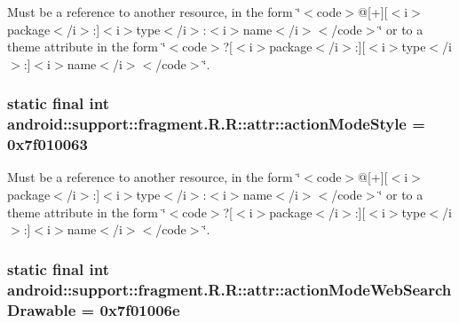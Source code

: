 Must be a reference to another resource, in the form \char`\"{}$<$code$>$@\mbox{[}+\mbox{]}\mbox{[}$<$i$>$package$<$/i$>$:\mbox{]}$<$i$>$type$<$/i$>$:$<$i$>$name$<$/i$>$$<$/code$>$\char`\"{} or to a theme attribute in the form \char`\"{}$<$code$>$?\mbox{[}$<$i$>$package$<$/i$>$:\mbox{]}\mbox{[}$<$i$>$type$<$/i$>$:\mbox{]}$<$i$>$name$<$/i$>$$<$/code$>$\char`\"{}. \hypertarget{classandroid_1_1support_1_1fragment_1_1_r_1_1attr_322ca029b16bd47dcd15649014130640}{
\subsubsection[{actionModeStyle}]{\setlength{\rightskip}{0pt plus 5cm}static final int android::support::fragment.R.R::attr::actionModeStyle = 0x7f010063}}
\label{classandroid_1_1support_1_1fragment_1_1_r_1_1attr_322ca029b16bd47dcd15649014130640}


Must be a reference to another resource, in the form \char`\"{}$<$code$>$@\mbox{[}+\mbox{]}\mbox{[}$<$i$>$package$<$/i$>$:\mbox{]}$<$i$>$type$<$/i$>$:$<$i$>$name$<$/i$>$$<$/code$>$\char`\"{} or to a theme attribute in the form \char`\"{}$<$code$>$?\mbox{[}$<$i$>$package$<$/i$>$:\mbox{]}\mbox{[}$<$i$>$type$<$/i$>$:\mbox{]}$<$i$>$name$<$/i$>$$<$/code$>$\char`\"{}. \hypertarget{classandroid_1_1support_1_1fragment_1_1_r_1_1attr_9decfc69a6ceffe9206aac1804be4beb}{
\subsubsection[{actionModeWebSearchDrawable}]{\setlength{\rightskip}{0pt plus 5cm}static final int android::support::fragment.R.R::attr::actionModeWebSearchDrawable = 0x7f01006e}}
\label{classandroid_1_1support_1_1fragment_1_1_r_1_1attr_9decfc69a6ceffe9206aac1804be4beb}


